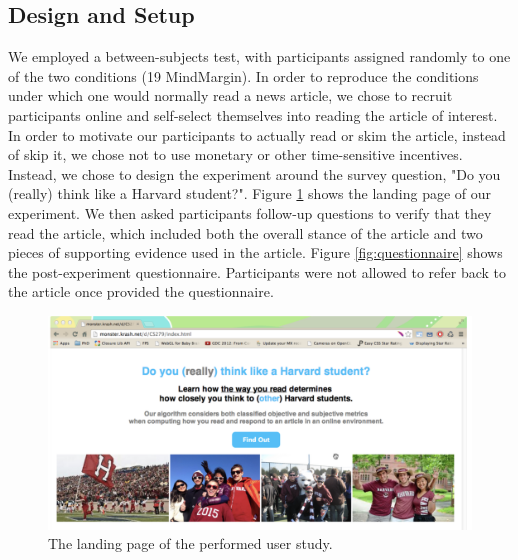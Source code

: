 \subsection{Design and Setup}
We employed a between-subjects test, with participants assigned randomly to one of the two conditions (19 MindMargin). In order to reproduce the conditions under which one would normally read a news article, we chose to recruit participants online and self-select themselves into reading the article of interest. In order to motivate our participants to actually read or skim the article, instead of skip it, we chose not to use monetary or other time-sensitive incentives. Instead, we chose to design the experiment around the survey question, "Do you (really) think like a Harvard student?". Figure \ref{fig:landingpage} shows the landing page of our experiment. We then asked participants follow-up questions to verify that they read the article, which included both the overall stance of the article and two pieces of supporting evidence used in the article. Figure \ref{fig:questionnaire} shows the post-experiment questionnaire. Participants were not allowed to refer back to the article once provided the questionnaire. 

\begin{figure}
\centering
\includegraphics[scale=0.23]{landingpage.png} 
\caption{The landing page of the performed user study.}
\label{fig:landingpage}
\end{figure}

